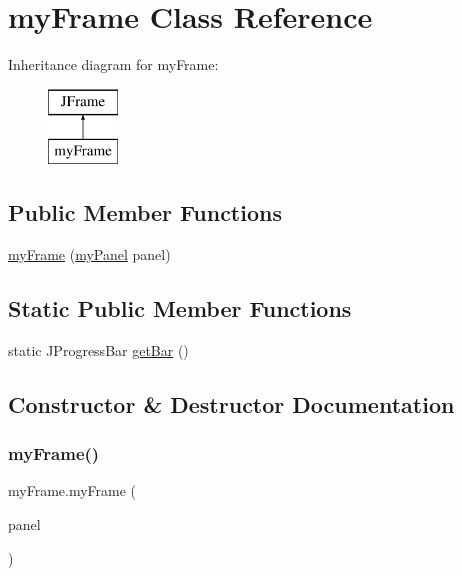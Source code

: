\hypertarget{classmy_frame}{}\section{my\+Frame Class Reference}
\label{classmy_frame}
Inheritance diagram for my\+Frame\+:\begin{figure}[H]
\begin{center}
\leavevmode
\includegraphics[height=2.000000cm]{classmy_frame}
\end{center}
\end{figure}
\subsection*{Public Member Functions}
\begin{DoxyCompactItemize}
\item 
\hyperlink{classmy_frame_a2b3c0cea5de20595de9c29760f8b69f3}{my\+Frame} (\hyperlink{classmy_panel}{my\+Panel} panel)
\end{DoxyCompactItemize}
\subsection*{Static Public Member Functions}
\begin{DoxyCompactItemize}
\item 
static J\+Progress\+Bar \hyperlink{classmy_frame_ab4821a86dfc373a36ef2d654cf81f238}{get\+Bar} ()
\end{DoxyCompactItemize}


\subsection{Constructor \& Destructor Documentation}
\hypertarget{classmy_frame_a2b3c0cea5de20595de9c29760f8b69f3}{}\label{classmy_frame_a2b3c0cea5de20595de9c29760f8b69f3} 
\subsubsection{\texorpdfstring{my\+Frame()}{myFrame()}}
{\footnotesize\ttfamily my\+Frame.\+my\+Frame (\begin{DoxyParamCaption}\item[{\hyperlink{classmy_panel}{my\+Panel}}]{panel }\end{DoxyParamCaption})}



